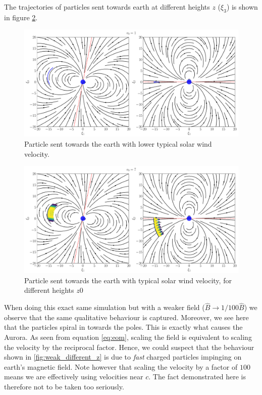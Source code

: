 The trajectories of particles sent towards earth at different heights $z$ ($\xi_3$) is shown in figure \ref{fig:different_z}.

\begin{figure}[htb]
	\centering
	\includegraphics[width=\columnwidth]{../fig/earth_traj_slow.pdf}
	\caption{Particle sent towards the earth with lower typical solar wind velocity.}
	\label{fig:slow_part}
\end{figure}
\begin{figure}[h!]
	\centering
	\includegraphics[width=\columnwidth]{../fig/traj_diffz.pdf}
	\caption{Particle sent towards the earth with typical solar wind velocity, for different heights $z0$}
	\label{fig:different_z}
\end{figure}

When doing this exact same simulation but with a weaker field ($\hat{B} \to 1/100 \hat{B}$) we observe that the same qualitative behaviour is captured. Moreover, we see here that the particles spiral in towards the poles. This is exactly what causes the Aurora. As seen from equation \eqref{eq:eom}, scaling the field is equivalent to scaling the velocity by the reciprocal factor. Hence, we could suspect that the behaviour shown in \ref{fig:weak_different_z} is due to \textit{fast} charged particles impinging on earth's magnetic field. Note however that scaling the velocity by a factor of $100$ means we are effectively using velocities near $c$. The fact demonstrated here is therefore not to be taken too seriously.

